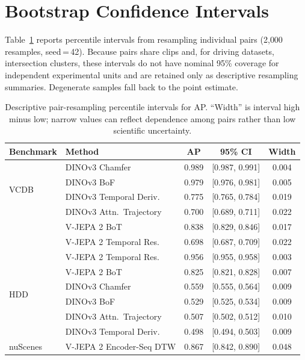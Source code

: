 \documentclass{article}
\theoremstyle{remark}
\begin{document}
\section{Bootstrap Confidence Intervals}
\label{sec:bootstrap_cis}

Table~\ref{tab:bootstrap} reports percentile intervals from resampling individual pairs (2{,}000 resamples, seed\,=\,42). Because pairs share clips and, for driving datasets, intersection clusters, these intervals do not have nominal 95\% coverage for independent experimental units and are retained only as descriptive resampling summaries. Degenerate samples fall back to the point estimate.

\begin{table}[h]
\centering
\caption{Descriptive pair-resampling percentile intervals for AP. ``Width'' is interval high minus low; narrow values can reflect dependence among pairs rather than low scientific uncertainty.}
\label{tab:bootstrap}
\begin{tabular}{llccc}
\toprule
\textbf{Benchmark} & \textbf{Method} & \textbf{AP} & \textbf{95\% CI} & \textbf{Width} \\
\midrule
\multirow{4}{*}{VCDB}
 & DINOv3 Chamfer           & 0.989 & [0.987, 0.991] & 0.004 \\
 & DINOv3 BoF               & 0.979 & [0.976, 0.981] & 0.005 \\
 & DINOv3 Temporal Deriv.   & 0.775 & [0.765, 0.784] & 0.019 \\
 & DINOv3 Attn.\ Trajectory & 0.700 & [0.689, 0.711] & 0.022 \\
 & V-JEPA 2 BoT             & 0.838 & [0.829, 0.846] & 0.017 \\
 & V-JEPA 2 Temporal Res.   & 0.698 & [0.687, 0.709] & 0.022 \\
\midrule
\multirow{6}{*}{HDD}
 & V-JEPA 2 Temporal Res.   & 0.956 & [0.955, 0.958] & 0.003 \\
 & V-JEPA 2 BoT             & 0.825 & [0.821, 0.828] & 0.007 \\
 & DINOv3 Chamfer           & 0.559 & [0.555, 0.564] & 0.009 \\
 & DINOv3 BoF               & 0.529 & [0.525, 0.534] & 0.009 \\
 & DINOv3 Attn.\ Trajectory & 0.507 & [0.502, 0.512] & 0.010 \\
 & DINOv3 Temporal Deriv.   & 0.498 & [0.494, 0.503] & 0.009 \\
\midrule
\multirow{7}{*}{nuScenes}
 & V-JEPA 2 Encoder-Seq DTW & 0.867 & [0.842, 0.890] & 0.048 \\

\end{tabular}
\end{table}
\end{document}
